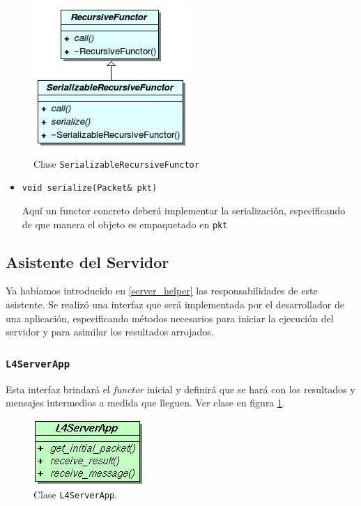         \begin{figure}[!htb] \hspace{3.8cm}
            \includegraphics[scale=0.75]{images/srf.png}
            \caption{Clase \texttt{SerializableRecursiveFunctor}}
        \end{figure}
   
    \begin{itemize}
        \item \texttt{void serialize(Packet\& pkt)}

        Aquí un functor concreto deberá implementar la serialización, especificando de que manera el objeto es
        empaquetado en \texttt{pkt}
    \end{itemize}


\subsection{Asistente del Servidor}

Ya habíamos introducido en \ref{server_helper} las responsabilidades de este asistente. Se realizó una interfaz que
será implementada por el desarrollador de una aplicación, especificando métodos necesarios para iniciar la ejecución del
servidor y para asimilar los resultados arrojados.

\subsubsection{\texttt{L4ServerApp}}

Esta interfaz brindará el \textit{functor} inicial y definirá que se hará con los resultados y mensajes intermedios a medida que
lleguen. Ver clase en figura \ref{l4_server_app}.

\begin{figure}[ht] \hspace{4.8cm}
    \includegraphics[scale=.68]{images/l4_server_app.png}
    \caption{Clase \texttt{L4ServerApp}.}
    \label{l4_server_app}
\end{figure}

